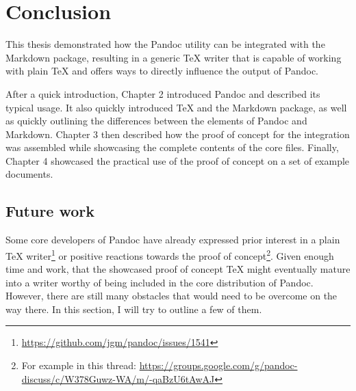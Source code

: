 \documentclass[
  digital,     %
  oneside,     %
  nosansbold,  %
  nocolorbold, %
  lof,         %
  nolot,       %
]{fithesis4}
\begin{document}
% 


\fi

\chapter{Conclusion}
This thesis demonstrated how the Pandoc utility can be integrated with the Markdown package, resulting in a generic \TeX{} writer that is capable of working with plain \TeX{} and offers ways to directly influence the output of Pandoc.

After a quick introduction, Chapter 2 introduced Pandoc and described its typical usage. It also quickly introduced \TeX{} and the Markdown package, as well as quickly outlining the differences between the elements of Pandoc and Markdown. Chapter 3 then described how the proof of concept for the integration was assembled while showcasing the complete contents of the core files.
\ifexamples
Finally, Chapter 4 showcased the practical use of the proof of concept on a set of example documents.
\fi

\section{Future work}
Some core developers of Pandoc have already expressed prior interest in a plain \TeX{} writer\footnote{\url{https://github.com/jgm/pandoc/issues/1541}} or positive reactions towards the proof of concept\footnote{For example in this thread: \url{https://groups.google.com/g/pandoc-discuss/c/W378Guwz-WA/m/-qaBzU6tAwAJ}}. Given enough time and work, that the showcased proof of concept \TeX{} might eventually mature into a writer worthy of being included in the core distribution of Pandoc. However, there are still many obstacles that would need to be overcome on the way there. In this section, I will try to outline a few of them.
\end{document}
